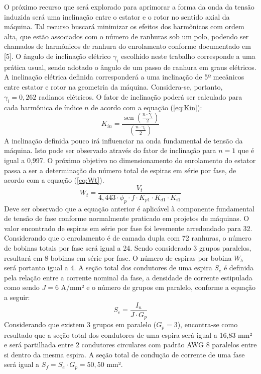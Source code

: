 \documentclass[conference]{IEEEtran}
\begin{document}
O próximo recurso que será explorado para aprimorar a forma da onda da tensão induzida será uma inclinação entre o estator e o rotor no sentido axial da máquina. Tal recurso buscará minimizar os efeitos dos harmônicos com ordem alta, que estão associados com o número de ranhuras sob um polo, podendo ser chamados de harmônicos de ranhura do enrolamento conforme documentado em [5]. O ângulo de inclinação elétrico $\gamma_i$ escolhido neste trabalho corresponde a uma prática usual, sendo adotado o ângulo de um passo de ranhura em graus elétricos. 
A inclinação elétrica definida corresponderá a uma inclinação de 5º mecânicos entre estator e rotor na geometria da máquina. Considera-se, portanto, $\gamma_i = 0,262$ radianos elétricos.
O fator de inclinação poderá ser calculado para cada harmônica de índice $n$ de acordo com a equação (\ref{eq:Kin}):
\begin{equation}
K_{in} = \frac{\operatorname{sen}\left(\frac{n \cdot \gamma_i}{2}\right)}{\left(\frac{n \cdot \gamma_i}{2}\right)}
\label{eq:Kin}
\end{equation}
A inclinação definida pouco irá influenciar na onda fundamental de tensão da máquina. Isto pode ser observado através do fator de inclinação para $n=1$ que é igual a 0,997. 
O próximo objetivo no dimensionamento do enrolamento do estator passa a ser a determinação do número total de espiras em série por fase, de acordo com a equação (\ref{eq:Wt}). 
\begin{equation}
W_t = \frac{V_t}{4{,}443 \cdot \phi_p \cdot f \cdot K_{p1} \cdot K_{d1} \cdot K_{i1} }
\label{eq:Wt}
\end{equation}
Deve ser observado que a equação anterior é aplicável à componente fundamental de tensão de fase conforme normalmente praticado em projetos de máquinas. 
O valor encontrado de espiras em série por fase foi levemente arredondado para 32. Considerando que o enrolamento é de camada dupla com 72 ranhuras, o número de bobinas totais por fase será igual a 24. Sendo considerado 3 grupos paralelos, resultará em 8 bobinas em série por fase. O número de espiras por bobina $W_b$ será portanto igual a 4.
A seção total dos condutores de uma espira $S_e$ é definida pela relação entre a corrente nominal da fase, a densidade de corrente estipulada como sendo $J = 6$ A/mm² e o número de grupos em paralelo, conforme a equação a seguir:
\begin{equation}
S_e = \frac{I_n}{J \cdot G_p}
\label{eq:Sc}
\end{equation}
Considerando que existem 3 grupos em paralelo ($G_p = 3$), encontra-se como resultado que a seção total dos condutores de uma espira será igual a 16,83 mm² e será partilhada entre 2 condutores circulares com padrão AWG 8 paralelos entre si dentro da mesma espira. A seção total de condução de corrente de uma fase será igual a $S_f = S_e \cdot G_p = 50,50$ mm².
\end{document}
